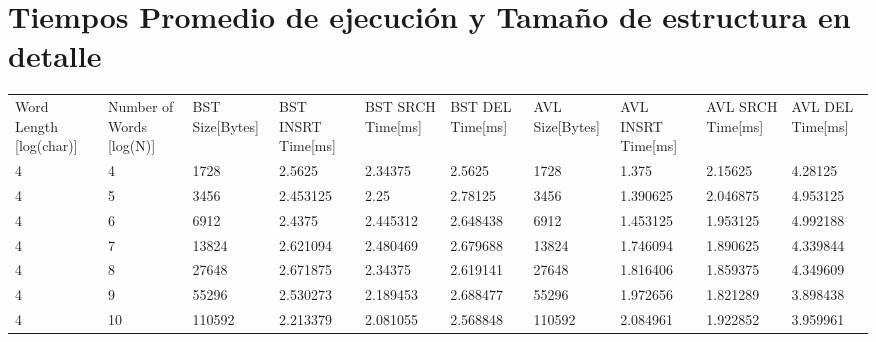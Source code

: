 \documentclass[12pt,letterpaper,hidelinks]{extarticle}
\begin{document}
\chapter{Tiempos Promedio de ejecución y Tamaño de estructura en detalle}
\begin{table}[]
\centering
\begin{tabular}{llllllllll}
Word Length {[}log(char){]} & Number of Words {[}log(N){]} & BST Size{[}Bytes{]} & BST INSRT Time{[}ms{]} & BST SRCH Time{[}ms{]} & BST DEL Time{[}ms{]} & AVL Size{[}Bytes{]} & AVL INSRT Time{[}ms{]} & AVL SRCH Time{[}ms{]} & AVL DEL Time{[}ms{]} \\
4                           & 4                            & 1728                & 2.5625                 & 2.34375               & 2.5625               & 1728                & 1.375                  & 2.15625               & 4.28125              \\
4                           & 5                            & 3456                & 2.453125               & 2.25                  & 2.78125              & 3456                & 1.390625               & 2.046875              & 4.953125             \\
4                           & 6                            & 6912                & 2.4375                 & 2.445312              & 2.648438             & 6912                & 1.453125               & 1.953125              & 4.992188             \\
4                           & 7                            & 13824               & 2.621094               & 2.480469              & 2.679688             & 13824               & 1.746094               & 1.890625              & 4.339844             \\
4                           & 8                            & 27648               & 2.671875               & 2.34375               & 2.619141             & 27648               & 1.816406               & 1.859375              & 4.349609             \\
4                           & 9                            & 55296               & 2.530273               & 2.189453              & 2.688477             & 55296               & 1.972656               & 1.821289              & 3.898438             \\
4                           & 10                           & 110592              & 2.213379               & 2.081055              & 2.568848             & 110592              & 2.084961               & 1.922852              & 3.959961             \\

\end{tabular}
\end{table}
\end{document}
